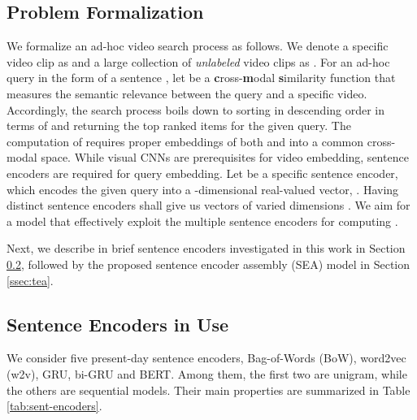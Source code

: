 \subsection{Problem Formalization}

We formalize an ad-hoc video search process as follows. We denote a specific video clip as  and a large collection of  \emph{unlabeled} video clips as . For an ad-hoc query in the form of a sentence , let  be a \textbf{c}ross-\textbf{m}odal \textbf{s}imilarity function that measures the semantic relevance between the query and a specific video. Accordingly, the search process boils down to sorting  in descending order in terms of  and returning the top ranked items for the given query. The computation of  requires proper embeddings of both  and  into a common cross-modal space. While visual CNNs are prerequisites for video embedding, sentence encoders are required for query embedding. Let  be a specific sentence encoder, which encodes the given query into a -dimensional real-valued vector, \ie .
Having  distinct sentence encoders  shall give us  vectors of varied dimensions . We aim for a model that effectively exploit the multiple sentence encoders for computing .

Next, we describe in brief sentence encoders investigated in this work in Section \ref{ssec:tes}, followed by the proposed sentence encoder assembly (SEA) model in Section \ref{ssec:tea}.

\subsection{Sentence Encoders in Use} \label{ssec:tes}

We consider five present-day sentence encoders, \ie Bag-of-Words (BoW), word2vec (w2v), GRU, bi-GRU and BERT. Among them, the first two are unigram, while the others are sequential models. Their main properties are summarized in Table \ref{tab:sent-encoders}.




